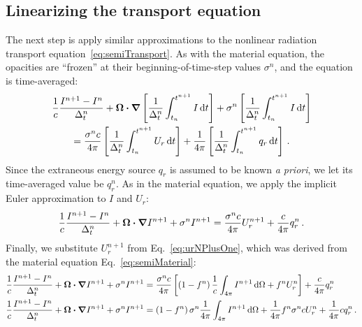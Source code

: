 \subsection{Linearizing the transport equation}
The next step is apply similar approximations to the nonlinear radiation
transport equation~\eqref{eq:semiTransport}. As with the material equation,
the
opacities are ``frozen'' at their beginning-of-time-step values $\sigma^n$, and
the equation is time-averaged:
\begin{multline*}
  \frac{1}{c} \frac{I^{n+1} - I^n}{\Delta_t^n}
  + \bm{\Omega} \bm{\cdot} \bm{\nabla} \left[
  \frac{1}{\Delta_t^n}\int_{t_n}^{t^{n+1}} I\mathop{}\!\mathrm{d} t
  \right] +
 \sigma^n \left[
  \frac{1}{\Delta_t^n}\int_{t_n}^{t^{n+1}} I\mathop{}\!\mathrm{d} t
  \right]
  \\
  = \frac{\sigma^n c}{4\pi} \left[
  \frac{1}{\Delta_t^n}\int_{t_n}^{t^{n+1}} U_r \mathop{}\!\mathrm{d} t \right]
  + \frac{1}{4\pi}\left[
  \frac{1}{\Delta_t^n}\int_{t_n}^{t^{n+1}} q_r \mathop{}\!\mathrm{d} t \right] \,.
\end{multline*}
Since the extraneous energy source $q_r$ is assumed to be known \emph{a priori},
we let its time-averaged value be $q_r^n$. As in the material equation, we apply
the implicit Euler approximation to $I$ and $U_r$:
\begin{equation*}
  \frac{1}{c} \frac{I^{n+1} - I^n}{\Delta_t^n}
  + \bm{\Omega} \bm{\cdot} \bm{\nabla} I^{n+1}
 + \sigma^n I^{n+1}
 = \frac{\sigma^n c}{4\pi} U_r^{n+1}
  + \frac{c}{4\pi} q_r^n \,.
\end{equation*}
Finally, we substitute $U_r^{n+1}$ from Eq.~\eqref{eq:urNPlusOne},
which was derived from the material equation Eq.~\eqref{eq:semiMaterial}:
\begin{align}\nonumber
  \frac{1}{c} \frac{I^{n+1} - I^n}{\Delta_t^n}
  + \bm{\Omega} \bm{\cdot} \bm{\nabla} I^{n+1}
 + \sigma^n I^{n+1}
 &= \frac{\sigma^n c}{4\pi} \left[ \left(1 - f^n\right) \frac1c \int_{4\pi} I^{n+1}\mathop{}\!\mathrm{d} \Omega + f^n U_r^n \right]
  + \frac{c}{4\pi} q_r^n
  \\ \label{eq:linearizedGrayTransport}
  \frac{1}{c} \frac{I^{n+1} - I^n}{\Delta_t^n}
  + \bm{\Omega} \bm{\cdot} \bm{\nabla} I^{n+1}
 + \sigma^n I^{n+1}
 &=  \left(1 - f^n\right) \sigma^n \frac{1}{4\pi} \int_{4\pi} I^{n+1}\mathop{}\!\mathrm{d} \Omega
 + \frac{1}{4\pi} f^n \sigma^n c U_r^n
  + \frac{1}{4\pi} c q_r^n \,.
\end{align}

